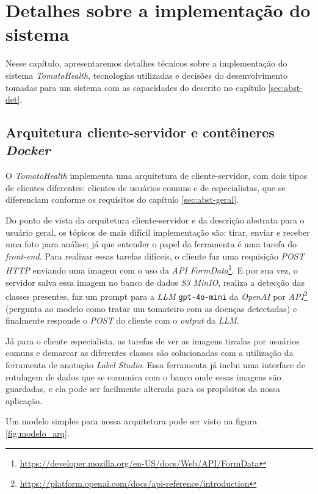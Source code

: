 \chapter{Detalhes sobre a implementação do sistema} \label{sec:implementacao_sistema}

Nesse capítulo, apresentaremos detalhes técnicos sobre a implementação do sistema \textit{TomatoHealth}, tecnologias utilizadas e decisões do desenvolvimento tomadas para um sistema com as capacidades do descrito no capítulo \ref{sec:abst-det}.

\section{Arquitetura cliente-servidor e contêineres \emph{Docker}}

O \emph{TomatoHealth} implementa uma arquitetura de cliente-servidor, com dois tipos de clientes diferentes: clientes de usuários comuns e de especialistas, que se diferenciam conforme os requisitos do capítulo \ref{sec:abst-geral}.

Do ponto de vista da arquitetura cliente-servidor e da descrição abstrata para o usuário geral, os tópicos de mais difícil implementação são: tirar, enviar e receber uma foto para análise; já que entender o papel da ferramenta é uma tarefa do \emph{front-end}. Para realizar essas tarefas difíceis, o cliente faz uma requisição \emph{POST HTTP} enviando uma imagem com o uso da \emph{API FormData}\footnote{\url{https://developer.mozilla.org/en-US/docs/Web/API/FormData}}. E por sua vez, o servidor salva essa imagem no banco de dados \emph{S3 MinIO}, realiza a detecção das classes presentes, faz um prompt para a \emph{LLM} \texttt{gpt-4o-mini} da \emph{OpenAI} por \emph{API}\footnote{\url{https://platform.openai.com/docs/api-reference/introduction}} (pergunta ao modelo como tratar um tomateiro com as doenças detectadas) e finalmente responde o \emph{POST} do cliente com o \emph{output} da \emph{LLM}.

Já para o cliente especialista, as tarefas de ver as imagens tiradas por usuários comuns e demarcar as diferentes classes são solucionadas com a utilização da ferramenta de anotação \emph{Label Studio}. Essa ferramenta já inclui uma interface de rotulagem de dados que se comunica com o banco onde essas imagens são guardadas, e ela pode ser facilmente alterada para os propósitos da nossa aplicação.

Um modelo simples para nossa arquitetura pode ser visto na figura \ref{fig:modelo_arq}.

